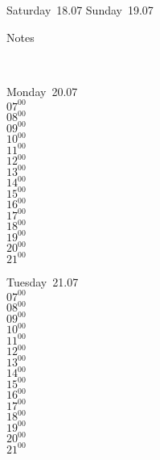 \documentclass[11pt,a4paper]{book}\usepackage[]{graphicx}\usepackage[]{color}
\begin{document}
{{{\begin{tcolorbox}
\end{tcolorbox} 
\begin{tcolorbox}[height=(\textheight-10mm)/6]
Saturday~18.07
\tcblower
Sunday~19.07
\end{tcolorbox} %
\begin{tcolorbox}[height=(\textheight-10mm)/6,sidebyside=false]
Notes
\end{tcolorbox}
\clearpage
\vspace{2 mm}\\
\begin{tcolorbox}
Monday~20.07\\
{ 
  $07^{00}$\\
$08^{00}$\\
$09^{00}$\\
$10^{00}$\\
$11^{00}$\\
$12^{00}$\\
$13^{00}$\\
$14^{00}$\\
$15^{00}$\\
$16^{00}$\\
$17^{00}$\\
$18^{00}$\\
$19^{00}$\\
$20^{00}$\\
$21^{00}$}\\

\end{tcolorbox}
\begin{tcolorbox}
Tuesday~21.07\\
{ 
  $07^{00}$\\
$08^{00}$\\
$09^{00}$\\
$10^{00}$\\
$11^{00}$\\
$12^{00}$\\
$13^{00}$\\
$14^{00}$\\
$15^{00}$\\
$16^{00}$\\
$17^{00}$\\
$18^{00}$\\
$19^{00}$\\
$20^{00}$\\
$21^{00}$}\\


\end{tcolorbox}}}}
\end{document}
